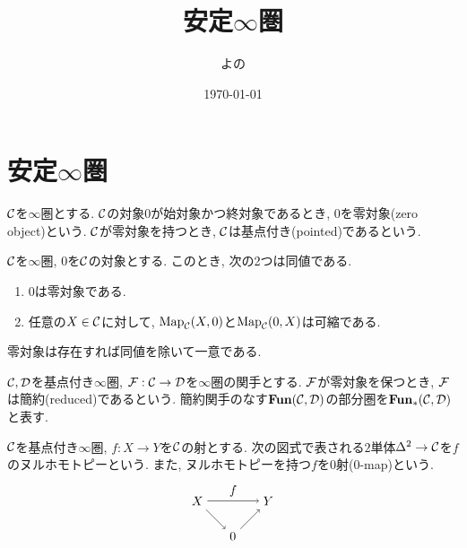 \documentclass[uplatex, a4paper, 14Q, dvipdfmx]{jsarticle}
\title{安定\texorpdfstring{$\infty$}{infty}圏}
\author{よの}
\date{\today}
\begin{document}
\maketitle

\begin{abstract}
\end{abstract}

\tableofcontents

\section{安定\texorpdfstring{$\infty$}{infty}圏}

\begin{definition}
  $\mathcal{C}$を$\infty$圏とする.
  $\mathcal{C}$の対象$0$が始対象かつ終対象であるとき, $0$を零対象(zero object)という.
  $\mathcal{C}$が零対象を持つとき, $\mathcal{C}$は基点付き(pointed)であるという.
\end{definition}

\begin{lemma}
  $\mathcal{C}$を$\infty$圏, $0$を$\mathcal{C}$の対象とする.
  このとき, 次の2つは同値である. 
  \begin{enumerate}
    \item $0$は零対象である. 
    \item 任意の$X \in \mathcal{C}$に対して, $\mathrm{Map}_{\mathcal{C}}(X,0)$と$\mathrm{Map}_{\mathcal{C}}(0,X)$は可縮である. 
  \end{enumerate}
\end{lemma}

\begin{remark}
  零対象は存在すれば同値を除いて一意である. 
\end{remark}

\begin{definition}[簡約関手]
  $\mathcal{C},\mathcal{D}$を基点付き$\infty$圏, $\mathcal{F} : \mathcal{C} \to \mathcal{D}$を$\infty$圏の関手とする. 
  $\mathcal{F}$が零対象を保つとき, $\mathcal{F}$は簡約(reduced)であるという.
  簡約関手のなす$\mathbf{Fun}(\mathcal{C},\mathcal{D})$の部分圏を$\mathbf{Fun}_\ast(\mathcal{C},\mathcal{D})$と表す. 
\end{definition}

\begin{definition}[ヌルホモトピー]
  $\mathcal{C}$を基点付き$\infty$圏, $f : X \to Y$を$\mathcal{C}$の射とする.
  次の図式で表される$2$単体$\Delta^2 \to \mathcal{C}$を$f$のヌルホモトピーという.
  また, ヌルホモトピーを持つ$f$を$0$射($0$-map)という. 
  \[
    \begin{tikzpicture}[auto,->]
      \node (0) at (1,0) {$0$};
      \node (X) at (0,1) {$X$};
      \node (Y) at (2,1) {$Y$};
      \draw (X) -- node {$f$} (Y);
      \draw (X) -- (0);
      \draw (0) -- (Y);
    \end{tikzpicture}
  \]
\end{definition}
\end{document}
